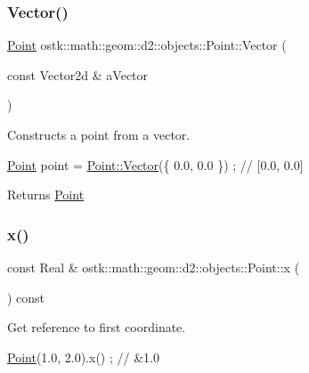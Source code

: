 \subsubsection{\texorpdfstring{Vector()}{Vector()}}
{\footnotesize\ttfamily \hyperlink{classostk_1_1math_1_1geom_1_1d2_1_1objects_1_1_point}{Point} ostk\+::math\+::geom\+::d2\+::objects\+::\+Point\+::\+Vector (\begin{DoxyParamCaption}\item[{const Vector2d \&}]{a\+Vector }\end{DoxyParamCaption})\hspace{0.3cm}{\ttfamily [static]}}



Constructs a point from a vector. 


\begin{DoxyCode}
\hyperlink{classostk_1_1math_1_1geom_1_1d2_1_1objects_1_1_point_ad4252af4171fbe3cff37ada7827e1966}{Point} point = \hyperlink{classostk_1_1math_1_1geom_1_1d2_1_1objects_1_1_point_a6153f8ba851a8be99595d225632959af}{Point::Vector}(\{ 0.0, 0.0 \}) ; \textcolor{comment}{// [0.0, 0.0]}
\end{DoxyCode}


\begin{DoxyReturn}{Returns}
\hyperlink{classostk_1_1math_1_1geom_1_1d2_1_1objects_1_1_point}{Point} 
\end{DoxyReturn}
\mbox{\label{classostk_1_1math_1_1geom_1_1d2_1_1objects_1_1_point_a59a7671f0609ce006479ae0d0f463e05}} 
\subsubsection{\texorpdfstring{x()}{x()}}
{\footnotesize\ttfamily const Real \& ostk\+::math\+::geom\+::d2\+::objects\+::\+Point\+::x (\begin{DoxyParamCaption}{ }\end{DoxyParamCaption}) const}



Get reference to first coordinate. 


\begin{DoxyCode}
\hyperlink{classostk_1_1math_1_1geom_1_1d2_1_1objects_1_1_point_ad4252af4171fbe3cff37ada7827e1966}{Point}(1.0, 2.0).x() ; \textcolor{comment}{// &1.0}
\end{DoxyCode}


